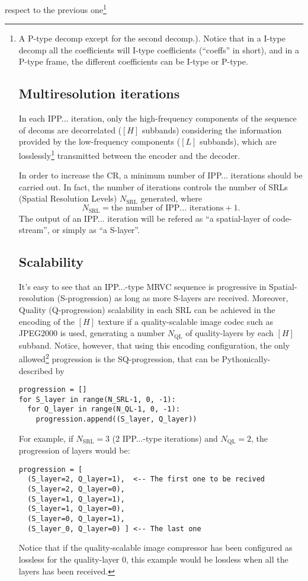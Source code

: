 respect to the previous one\footnote{A P-type decomp except for the
second decomp.). Notice that in a I-type decomp all the coefficients
will I-type coefficients (``coeffs'' in short), and in a P-type frame,
the different coefficients can be I-type or P-type.

\subsection{Multiresolution iterations}
In each IPP... iteration, only the high-frequency components of the
sequence of decoms are decorrelated ($[H]$ subbands) considering the
information provided by the low-frequency components ($[L]$ subbands),
which are losslessly\footnote{The $[L]$ information must be always
decoded with the quality that the encoder used for reconstruct the
corresponding SRL.} transmitted between the encoder and the decoder.

In order to increase the CR, a minimum number of IPP... iterations
should be carried out. In fact, the number of iterations controls the
number of SRLs (Spatial Resolution Levels) $N_{\text{SRL}}$ generated,
where
\begin{equation}
  N_{\text{SRL}} = \text{the number of IPP... iterations} + 1.
\end{equation}
The output of an IPP... iteration will be refered as ``a
spatial-layer of code-stream'', or simply as ``a S-layer''.

\subsection{Scalability}
It's easy to see that an IPP...-type MRVC sequence is progressive in
Spatial-resolution (S-progression) as long as more S-layers are
received. Moreover, Quality (Q-progression) scalability in each SRL
can be achieved in the encoding of the $[H]$ texture if a
quality-scalable image codec such as JPEG2000 is used, generating a
number $N_{\text{QL}}$ of quality-layers by each $[H]$
subband. Notice, however, that using this encoding configuration, the
only allowed\footnote{Suposing that the order of the layers could be
modified in the code-stream.} progression is the SQ-progression, that
can be Pythonically-described by
\begin{verbatim}
progression = []
for S_layer in range(N_SRL-1, 0, -1):
  for Q_layer in range(N_QL-1, 0, -1):
    progression.append((S_layer, Q_layer))
\end{verbatim}

For example, if $N_{\text{SRL}}=3$ (2 IPP...-type iterations) and
$N_{\text{QL}}=2$, the progression of layers would be:
\begin{verbatim}
progression = [
  (S_layer=2, Q_layer=1),  <-- The first one to be recived
  (S_layer=2, Q_layer=0),
  (S_layer=1, Q_layer=1),
  (S_layer=1, Q_layer=0),
  (S_layer=0, Q_layer=1),
  (S_layer_0, Q_layer=0) ] <-- The last one
\end{verbatim}
Notice that if the quality-scalable image compressor has been
configured as lossless for the quality-layer 0, this example
would be lossless when all the layers has been received.

}
